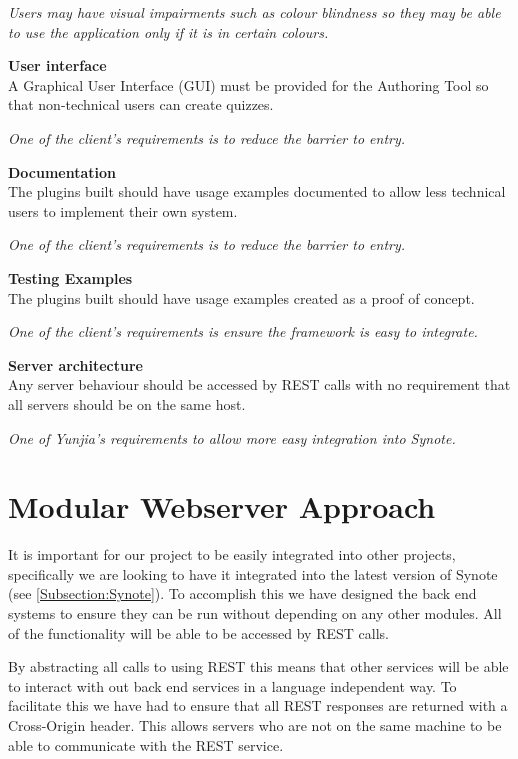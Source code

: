 \begin{requirement}[label=\textbf{N\arabic*}]
\textit{Users may have visual impairments such as colour blindness so they may be able to use the application only if it is in certain colours.}
\item \textbf{User interface} \label{Req:User interface} \hfill \\ A Graphical User Interface (GUI) must be provided for the Authoring Tool so that non-technical users can create quizzes.

\textit{One of the client's requirements is to reduce the barrier to entry.}
\item \textbf{Documentation} \label{Req:Documentation} \hfill \\ The plugins built should have usage examples documented to allow less technical users to implement their own system.

\textit{One of the client's requirements is to reduce the barrier to entry.}
\item \textbf{Testing Examples} \label{Req:Testing Examples} \hfill \\ The plugins built should have usage examples created as a proof of concept.

\textit{One of the client's requirements is ensure the framework is easy to integrate.}
\item \textbf{Server architecture} \label{Req:Server architecture} \hfill \\ Any server behaviour should be accessed by \gls{REST} calls with no requirement that all servers should be on the same host.

\textit{One of Yunjia's requirements to allow more easy integration into Synote.}
\end{requirement}

\section{Modular Webserver Approach}
\label{Section:Modular Approach}
It is important for our project to be easily integrated into other projects, specifically we are looking to have it integrated into the latest version of Synote (see \autoref{Subsection:Synote}). To accomplish this we have designed the back end systems to ensure they can be run without depending on any other modules. All of the functionality will be able to be accessed by \gls{REST} calls.

By abstracting all calls to using \gls{REST} this means that other services will be able to interact with out back end services in a language independent way. To facilitate this we have had to ensure that all \gls{REST} responses are returned with a Cross-Origin header. This allows servers who are not on the same machine to be able to communicate with the \gls{REST} service.

